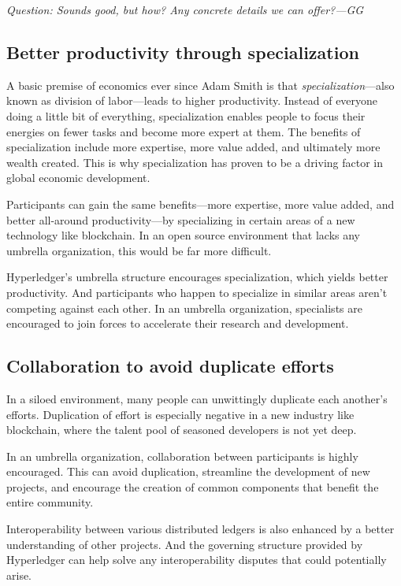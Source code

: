 \emph{Question: Sounds good, but how? Any concrete details we can offer?---GG}

\subsection{Better productivity through specialization}
A basic premise of economics ever since Adam Smith is that \emph{specialization}---also known as division of labor---leads to higher productivity. 
Instead of everyone doing a little bit of everything, specialization enables people to focus their energies on fewer tasks and become more expert at them. 
The benefits of specialization include more expertise, more value added, and ultimately more wealth created. 
This is why specialization has proven to be a driving factor in global economic development. 

Participants can gain the same benefits---more expertise, more value added, and better all-around productivity---by specializing in certain areas of a new technology like blockchain. 
In an open source environment that lacks any umbrella organization, this would be far more difficult. 

Hyperledger's umbrella structure encourages specialization, which yields better productivity. 
And participants who happen to specialize in similar areas aren't competing against each other. 
In an umbrella organization, specialists are encouraged to join forces to accelerate their research and development. 

\subsection{Collaboration to avoid duplicate efforts}
In a siloed environment, many people can unwittingly duplicate each another's efforts. Duplication of effort is especially negative in a new industry like blockchain, where the talent pool of seasoned developers is not yet deep. 

In an umbrella organization, collaboration between participants is highly encouraged. 
This can avoid duplication, streamline the development of new projects, and encourage the creation of common components that benefit the entire community. 

Interoperability between various distributed ledgers is also enhanced by a better understanding of other projects. 
And the governing structure provided by Hyperledger can help solve any interoperability disputes that could potentially arise. 

